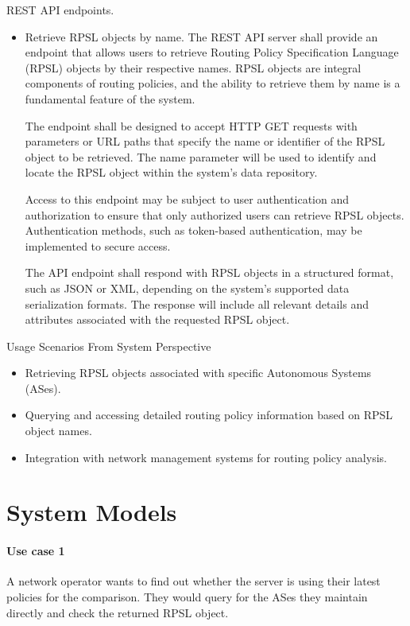 \documentclass[12pt]{article}
\begin{document}
REST API endpoints.
\begin{itemize}
    \item Retrieve RPSL objects by name.
    The REST API server shall provide an endpoint that allows users to retrieve Routing Policy Specification Language (RPSL) objects by their respective names. RPSL objects are integral components of routing policies, and the ability to retrieve them by name is a fundamental feature of the system.

    The endpoint shall be designed to accept HTTP GET requests with parameters or URL paths that specify the name or identifier of the RPSL object to be retrieved. The name parameter will be used to identify and locate the RPSL object within the system's data repository.

    Access to this endpoint may be subject to user authentication and authorization to ensure that only authorized users can retrieve RPSL objects. Authentication methods, such as token-based authentication, may be implemented to secure access.

    The API endpoint shall respond with RPSL objects in a structured format, such as JSON or XML, depending on the system's supported data serialization formats. The response will include all relevant details and attributes associated with the requested RPSL object.
\end{itemize}
 Usage Scenarios From System Perspective
 \begin{itemize}
     \item Retrieving RPSL objects associated with specific Autonomous Systems (ASes).
     \item Querying and accessing detailed routing policy information based on RPSL object names.
     \item Integration with network management systems for routing policy analysis.
 \end{itemize}


\section{System Models}
\paragraph{Use case 1}
A network operator wants to find out whether the server is
using their latest policies for the comparison.
They would query for the ASes they maintain directly and
check the returned RPSL object.
\end{document}
